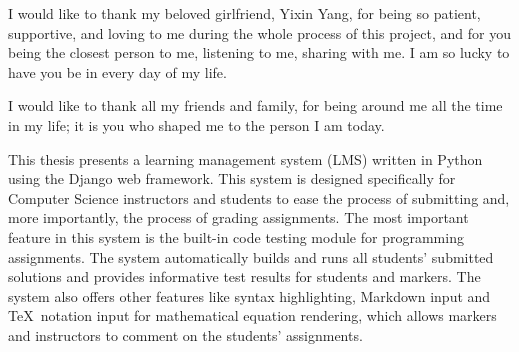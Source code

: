 \medskip

I would like to thank my beloved girlfriend, Yixin Yang,
for being so patient, supportive, and loving to me during the whole process
of this project, 
and for you being the closest person to me, listening to me, sharing with me.
I am so lucky to have you be in every day of my life.

\medskip

I would like to thank all my friends and family, for being around me all
the time in my life; it is you who shaped me to the person
I am today.



\tocAndSuch



This thesis presents a learning management system (LMS) written in Python using
the Django web framework. This system is designed specifically for Computer
Science instructors and students to ease the process of submitting and,
more importantly, the process of grading assignments. 
The most important feature in this system is the built-in code
testing module for programming assignments. The system
automatically builds and runs all students'
submitted solutions and provides informative test results for students and
markers.
The system also offers other features like syntax highlighting, Markdown input
and \TeX\ notation input for mathematical equation rendering, which allows
markers and instructors to comment on the students' assignments.



\afterpreface
